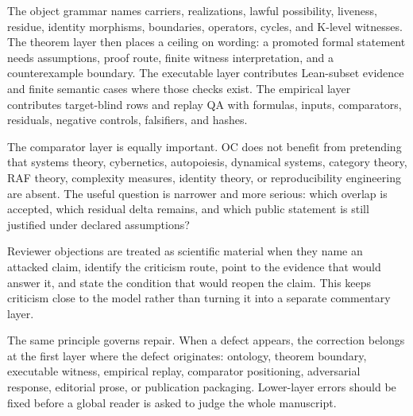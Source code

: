 The object grammar names carriers, realizations, lawful possibility, liveness, residue, identity morphisms, boundaries, operators, cycles, and K-level witnesses. The theorem layer then places a ceiling on wording: a promoted formal statement needs assumptions, proof route, finite witness interpretation, and a counterexample boundary. The executable layer contributes Lean-subset evidence and finite semantic cases where those checks exist. The empirical layer contributes target-blind rows and replay QA with formulas, inputs, comparators, residuals, negative controls, falsifiers, and hashes.

The comparator layer is equally important. OC does not benefit from pretending that systems theory, cybernetics, autopoiesis, dynamical systems, category theory, RAF theory, complexity measures, identity theory, or reproducibility engineering are absent. The useful question is narrower and more serious: which overlap is accepted, which residual delta remains, and which public statement is still justified under declared assumptions?

Reviewer objections are treated as scientific material when they name an attacked claim, identify the criticism route, point to the evidence that would answer it, and state the condition that would reopen the claim. This keeps criticism close to the model rather than turning it into a separate commentary layer.

The same principle governs repair. When a defect appears, the correction belongs at the first layer where the defect originates: ontology, theorem boundary, executable witness, empirical replay, comparator positioning, adversarial response, editorial prose, or publication packaging. Lower-layer errors should be fixed before a global reader is asked to judge the whole manuscript.
